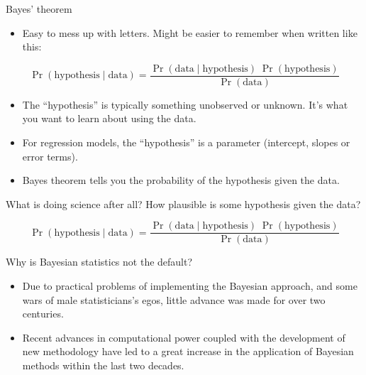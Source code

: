 \documentclass[
  ignorenonframetext,
  aspectratio=169]{beamer}
\providecommand{\tightlist}{%
  \setlength{\itemsep}{0pt}\setlength{\parskip}{0pt}}
\begin{document}
\begin{frame}{Bayes' theorem}
\protect\hypertarget{bayes-theorem-1}{}
\begin{itemize}[<+->]
\tightlist
\item
  Easy to mess up with letters. Might be easier to remember when written
  like this:
\end{itemize}

\[ \Pr(\text{hypothesis} \mid \text{data}) = \frac{ \Pr(\text{data} \mid \text{hypothesis}) \; \Pr(\text{hypothesis})}{\Pr(\text{data})} \]

\begin{itemize}[<+->]
\tightlist
\item
  The ``hypothesis'' is typically something unobserved or unknown. It's
  what you want to learn about using the data.
\end{itemize}

\begin{itemize}[<+->]
\tightlist
\item
  For regression models, the ``hypothesis'' is a parameter (intercept,
  slopes or error terms).
\end{itemize}

\begin{itemize}[<+->]
\tightlist
\item
  Bayes theorem tells you the probability of the hypothesis given the
  data.
\end{itemize}
\end{frame}

\begin{frame}{What is doing science after all?}
\protect\hypertarget{what-is-doing-science-after-all}{}
How plausible is some hypothesis given the data?

\[ \Pr(\text{hypothesis} \mid \text{data}) = \frac{ \Pr(\text{data} \mid \text{hypothesis}) \; \Pr(\text{hypothesis})}{\Pr(\text{data})} \]
\end{frame}

\begin{frame}{Why is Bayesian statistics not the default?}
\protect\hypertarget{why-is-bayesian-statistics-not-the-default}{}
\begin{itemize}[<+->]
\tightlist
\item
  Due to practical problems of implementing the Bayesian approach, and
  some wars of male statisticians's egos, little advance was made for
  over two centuries.
\end{itemize}

\begin{itemize}[<+->]
\tightlist
\item
  Recent advances in computational power coupled with the development of
  new methodology have led to a great increase in the application of
  Bayesian methods within the last two decades.
\end{itemize}
\end{frame}
\end{document}
